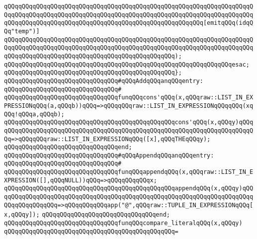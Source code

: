 \verb|qQQqqQQqqQQqqQQqqQQqqQQqqQQqqQQqqQQqqQQqqQQqqQQqqQQqqQQqqQQqqQQqqQQqqQQqqQQqqQQqqQQqqQQqqQQqqQQqqQQqqQQqqQQqqQQqqQQqqQQqqQQqqQQqqQQqqQQqqQQqqQQqqQQqqQQqqQQqqQQqqQQqqQQqqQQqqQQqqQQqqQQqqQQqqQQqqQQq[emitqQQq(idqQQq"temp")]|\newline
\verb|qQQqqQQqqQQqqQQqqQQqqQQqqQQqqQQqqQQqqQQqqQQqqQQqqQQqqQQqqQQqqQQqqQQqqQQqqQQqqQQqqQQqqQQqqQQqqQQqqQQqqQQqqQQqqQQqqQQqqQQqqQQqqQQqqQQqqQQqqQQqqQQqqQQqqQQqqQQqqQQqqQQqqQQqqQQqqQQqqQQqqQQqqQQq);|\newline
\verb|qQQqqQQqqQQqqQQqqQQqqQQqqQQqqQQqqQQqqQQqqQQqqQQqqQQqqQQqqQQqqQQqesac;|\newline
\verb|qQQqqQQqqQQqqQQqqQQqqQQqqQQqqQQqqQQqqQQqqQQqqQQq};|\newline
\newline
\verb|qQQqqQQqqQQqqQQqqQQqqQQqqQQqqQQq#qQQqAddqQQqanqQQqentry:|\newline
\verb|qQQqqQQqqQQqqQQqqQQqqQQqqQQqqQQq#|\newline
\verb|qQQqqQQqqQQqqQQqqQQqqQQqqQQqqQQqfunqQQqcons'qQQq(x,qQQqraw::LIST_IN_EXPRESSIONqQQq(a,qQQqb))qQQq=>qQQqqQQqraw::LIST_IN_EXPRESSIONqQQqqQQq(xqQQq!qQQqa,qQQqb);|\newline
\verb|qQQqqQQqqQQqqQQqqQQqqQQqqQQqqQQqqQQqqQQqqQQqqQQqcons'qQQq(x,qQQqy)qQQqqQQqqQQqqQQqqQQqqQQqqQQqqQQqqQQqqQQqqQQqqQQqqQQqqQQqqQQqqQQqqQQqqQQqqQQq=>qQQqqQQqraw::LIST_IN_EXPRESSIONqQQq([x],qQQqTHEqQQqy);|\newline
\verb|qQQqqQQqqQQqqQQqqQQqqQQqqQQqqQQqend;|\newline
\newline
\verb|qQQqqQQqqQQqqQQqqQQqqQQqqQQqqQQq#qQQqAppendqQQqanqQQqentry:|\newline
\verb|qQQqqQQqqQQqqQQqqQQqqQQqqQQqqQQq#|\newline
\verb|qQQqqQQqqQQqqQQqqQQqqQQqqQQqqQQqfunqQQqappendqQQq(x,qQQqraw::LIST_IN_EXPRESSION([],qQQqNULL))qQQq=>qQQqqQQqqQQqx;|\newline
\verb|qQQqqQQqqQQqqQQqqQQqqQQqqQQqqQQqqQQqqQQqqQQqqQQqappendqQQq(x,qQQqy)qQQqqQQqqQQqqQQqqQQqqQQqqQQqqQQqqQQqqQQqqQQqqQQqqQQqqQQqqQQqqQQqqQQqqQQqqQQqqQQqqQQqqQQq=>qQQqqQQqqQQqapp("@",qQQqraw::TUPLE_IN_EXPRESSIONqQQq[x,qQQqy]);|\newline
\verb|qQQqqQQqqQQqqQQqqQQqqQQqqQQqqQQqend;|\newline
\newline
\verb|qQQqqQQqqQQqqQQqqQQqqQQqqQQqqQQqfunqQQqcompare_literalqQQq(x,qQQqy)|\newline
\verb|qQQqqQQqqQQqqQQqqQQqqQQqqQQqqQQqqQQqqQQqqQQqqQQq=|\newline
